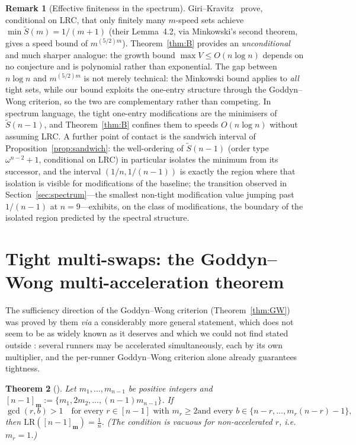 \documentclass[11pt]{article}
\newtheorem{theorem}{Theorem}[section]
\theoremstyle{definition}
\newtheorem{remark}[theorem]{Remark}
\newcommand{\LR}{\mathrm{LR}}
\begin{document}
\begin{remark}[Effective finiteness in the spectrum]\label{rem:spectrum}
Giri--Kravitz~\cite{GiriKravitz2026} prove, conditional on LRC, that only
finitely many $m$-speed sets achieve $\min\widetilde{S}(m)=1/(m+1)$ (their
Lemma~4.2, via Minkowski's second theorem, gives a speed bound of
$m^{(5/2)m}$).  Theorem~\ref{thm:B} provides an \emph{unconditional} and
much sharper analogue: the growth bound $\max V\le O(n\log n)$ depends on
no conjecture and is polynomial rather than exponential.  The gap between
$n\log n$ and $m^{(5/2)m}$ is not merely technical: the Minkowski bound
applies to \emph{all} tight sets, while our bound exploits the one-entry
structure through the Goddyn--Wong criterion, so the two are complementary
rather than competing.  In spectrum language, the tight one-entry
modifications are the minimisers of $\widetilde{S}(n-1)$, and
Theorem~\ref{thm:B} confines them to speeds $O(n\log n)$ without assuming
LRC.  A further point of contact is the sandwich interval of
Proposition~\ref{prop:sandwich}: the well-ordering of
$\widetilde{S}(n-1)$ (order type $\omega^{n-2}+1$, conditional on LRC)
in particular isolates the minimum from its successor, and the interval
$(1/n,1/(n-1))$ is exactly the region where that isolation is visible
for modifications of the baseline; the transition observed in
Section~\ref{sec:spectrum}---the smallest non-tight modification value
jumping past $1/(n-1)$ at $n=9$---exhibits, on the class of
modifications, the boundary of the isolated region predicted by the
spectral structure.
\end{remark}

\section{Tight multi-swaps: the Goddyn--Wong multi-acceleration theorem}\label{sec:kgw}

The sufficiency direction of the Goddyn--Wong criterion
(Theorem~\ref{thm:GW}) was proved by them \emph{via} a considerably more
general statement, which does not seem to be as widely known as it
deserves and which we could not find stated outside
\cite[Section~3]{GoddynWong2006}: several runners may be accelerated
simultaneously, each by its own multiplier, and the per-runner
Goddyn--Wong criterion alone already guarantees tightness.

\begin{theorem}[{\cite[Thm.~3.1]{GoddynWong2006}}]\label{thm:gwmulti}
Let $m_1,\dots,m_{n-1}$ be positive integers and
$[n-1]_{\mathbf m}:=\{m_1,2m_2,\dots,(n-1)m_{n-1}\}$.  If
\begin{equation}\label{eq:gwmulti}
\gcd(r,b)>1\quad\text{for every }r\in[n-1]\text{ with }m_r\ge2\text{
and every }b\in\{n-r,\dots,m_r(n-r)-1\},
\end{equation}
then $\LR([n-1]_{\mathbf m})=\frac1n$.  (The condition is vacuous for
non-accelerated $r$, i.e.\ $m_r=1$.)
\end{theorem}
\end{document}
